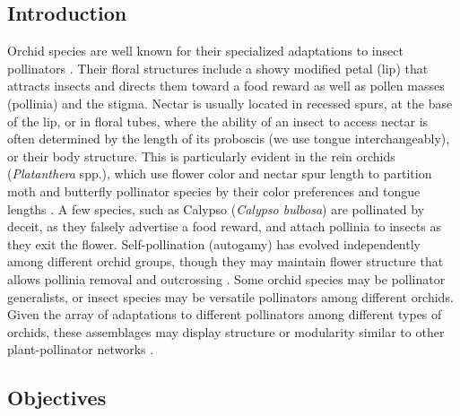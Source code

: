 \vspace{4mm}

\begin{multicols}{2}





\section{Introduction} 

Orchid species are well known for their specialized adaptations to
insect pollinators \citep[e.g.,][]{Darwin1862, Argue2012a, Argue2012b}. Their floral
structures include a showy modified petal (lip) that attracts insects
and directs them toward a food reward as well as pollen masses
(pollinia) and the stigma. Nectar is usually located in recessed spurs,
at the base of the lip, or in floral tubes, where the ability of an
insect to access nectar is often determined by the length of its
proboscis (we use tongue interchangeably), or their body structure. This
is particularly evident in the rein orchids (\emph{Platanthera} spp.),
which use flower color and nectar spur length to partition moth and
butterfly pollinator species by their color preferences and tongue
lengths \citep{HapemanInoue1997}. A few species, such as Calypso
(\emph{Calypso bulbosa}) are pollinated by deceit, as they falsely
advertise a food reward, and attach pollinia to insects as they exit the
flower. Self-pollination (autogamy) has evolved independently among
different orchid groups, though they may maintain flower structure that
allows pollinia removal and outcrossing \citep{Catling1983}. Some orchid
species may be pollinator generalists, or insect species may be
versatile pollinators among different orchids. Given the array of
adaptations to different pollinators among different types of orchids,
these assemblages may display structure or modularity similar to other
plant-pollinator networks \citep[e.g.,][]{Olesenetal2007}.

\subsection{Objectives}


\end{multicols}
